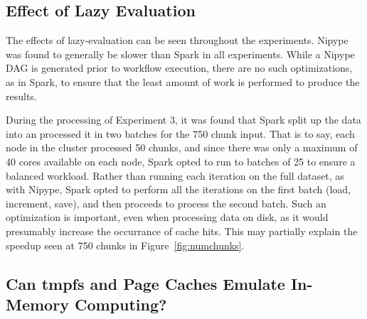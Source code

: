 \documentclass{IEEEtran}
\begin{document}
\subsection{Effect of Lazy Evaluation}

The effects of lazy-evaluation can be seen throughout the experiments. Nipype 
was found to generally be slower than Spark in all experiments. While a Nipype DAG is 
generated prior to workflow execution, there are no such optimizations, as in 
Spark, to ensure that the least amount of work is performed to produce the 
results. 

During the processing of Experiment 3, it was found that Spark split up the data
into an processed it in two batches for the 750 chunk input. That is to say, 
each node in the cluster processed 50 chunks, and since there was only a maximum
of 40 cores available on each node, Spark opted to run to batches of 25 to ensure
a balanced workload. Rather than running each iteration on the full dataset, as with Nipype, 
Spark opted to perform all the iterations on the first batch (load, increment, save),
and then proceeds to process the second batch. Such an optimization is important, 
even when processing data on disk, as it would presumably increase the occurrance
of cache hits. This may partially explain the speedup seen at 750 chunks in
Figure~\ref{fig:numchunks}.%

\subsection{Can tmpfs and Page Caches Emulate In-Memory Computing?}
\end{document}
